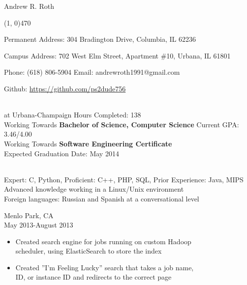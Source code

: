 \documentclass[11pt]{article}
\begin{document}
  \centerline{{\Huge \sc Andrew R. Roth}}
  \noindent\line(1, 0){470}\\
  \centerline{
    Permanent Address:
      304 Bradington Drive,
      Columbia,
      IL 62236
  }
  \centerline{
    Campus Address:
      702 West Elm Street,
      Apartment \#10,
      Urbana,
      IL 61801
  }
  \centerline{
    Phone: (618) 806-5904
    \indent Email: andrewroth1991@gmail.com
  }
  \centerline{
    Github: \url{https://github.com/ps2dude756}
  }

  \bigskip

  \\
     at Urbana-Champaign \hfill 
      Hours Completed: 138\\
    \indent Working Towards {\bf Bachelor of Science, Computer Science} \hfill 
      Current GPA: 3.46/4.00\\
    \indent Working Towards {\bf Software Engineering Certificate}\\
    \indent Expected Graduation Date: May 2014

  \bigskip

  \\
  \indent Expert: C, Python, Proficient: C++, PHP, SQL, Prior Experience: Java, MIPS\\
    \indent Advanced knowledge working in a Linux/Unix environment\\
    \indent Foreign languages: Russian and Spanish at a conversational level

  \bigskip

    \smallskip

     \hfill Menlo Park, CA\\
     \hfill May 2013-August 2013
    \begin{itemize}[noitemsep,topsep=0pt,leftmargin=52pt]
      \item Created search engine for jobs running on custom Hadoop\\
        scheduler, using ElasticSearch to store the index
      \item Created ''I'm Feeling Lucky'' search that takes a job name,\\
        ID, or instance ID and redirects to the correct page
    \end{itemize}
    \medskip
\end{document}
